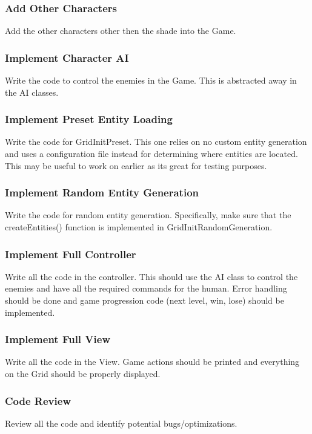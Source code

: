 \documentclass[12pt]{article}
\begin{document}
\subsubsection*{Add Other Characters}
Add the other characters other then the shade into the Game.


\subsubsection*{Implement Character AI}
Write the code to control the enemies in the Game. This is abstracted away in the AI classes.


\subsubsection*{Implement Preset Entity Loading}
Write the code for GridInitPreset. This one relies on no custom entity generation and uses a configuration file instead for determining where entities are located. This may be useful to work on earlier as its great for testing purposes.


\subsubsection*{Implement Random Entity Generation}
Write the code for random entity generation. Specifically, make sure that the createEntities() function is implemented in GridInitRandomGeneration.


\subsubsection*{Implement Full Controller}
Write all the code in the controller. This should use the AI class to control the enemies and have all the required commands for the human. Error handling should be done and game progression code (next level, win, lose) should be implemented.


\subsubsection*{Implement Full View}
Write all the code in the View. Game actions should be printed and everything on the Grid should be properly displayed.


\subsubsection*{Code Review}
Review all the code and identify potential bugs/optimizations.
\end{document}
